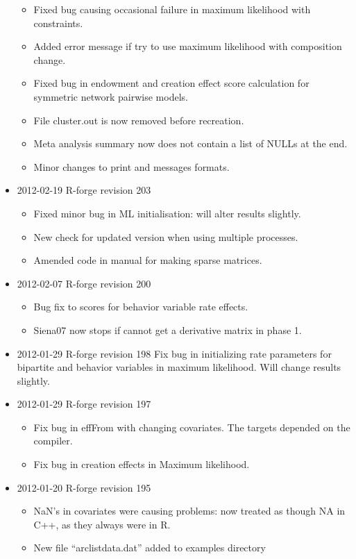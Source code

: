 \documentclass[a4paper,fleqn,11pt]{article}
\newcommand{\+}{\, + \,}
\begin{document}
\begin{small}
\begin{itemize}
\begin{itemize}
\item Fixed bug causing occasional failure in maximum likelihood with
  constraints.
\item Added error message if try to use maximum likelihood with composition
  change.
\item Fixed bug in endowment and creation effect score calculation for symmetric
  network pairwise models.
\item File cluster.out is now removed before recreation.
\item Meta analysis summary now does not contain a list of NULLs at the end.
\item Minor changes to print and messages formats.
\end{itemize}
\item 2012-02-19 R-forge revision 203
\begin{itemize}
\item Fixed minor bug in ML initialisation: will alter results slightly.
\item New check for updated version when using multiple processes.
\item Amended code in manual for making sparse matrices.
\end{itemize}
\item 2012-02-07 R-forge revision 200
\begin{itemize}
\item Bug fix to scores for behavior variable rate effects.
\item Siena07 now stops if cannot get a derivative matrix in phase 1.
\end{itemize}
\item 2012-01-29 R-forge revision 198
Fix bug in initializing rate parameters for bipartite and behavior variables in
maximum likelihood. Will change results slightly.
\item 2012-01-29 R-forge revision 197
\begin{itemize}
\item Fix bug in effFrom with changing covariates. The targets depended on the
compiler.
\item Fix bug in creation effects in Maximum likelihood.
\end{itemize}
\item 2012-01-20 R-forge revision 195
\begin{itemize}
\item NaN's in covariates were causing problems: now treated as though NA
    in C++, as they always were in R.
\item New file ``arclistdata.dat'' added to examples directory

\end{itemize}
\end{itemize}
\end{small}
\end{document}
